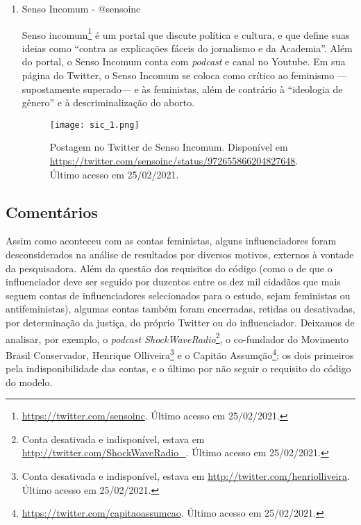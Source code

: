 \documentclass[
	12pt,				%
	openright,			%
	twoside,			%
	a4paper,			%
	english,			%
	brazil				%
	]{abntex2}
\begin{document}
\begin{anexosenv}
\begin{enumerate}
 \item Senso Incomum - @sensoinc
 
 Senso incomum\footnote{\url{https://twitter.com/sensoinc}. Último acesso em 25/02/2021.} é um portal que discute política e cultura, e que define suas ideias como ``contra as explicações fáceis do jornalismo e da Academia''. Além do portal, o Senso Incomum conta com \textit{podcast} e canal no Youtube. Em sua página do Twitter, o Senso Incomum se coloca como crítico ao feminismo --- supostamente superado--- e às feministas, além de contrário à ``ideologia de gênero'' e à descriminalização do aborto.
 
 \begin{figure}[!htbp]
    \centering
    \texttt{[image: sic\_1.png]}
    \caption{Postagem no Twitter de Senso Incomum. Disponível em \url{https://twitter.com/sensoinc/status/972655866204827648}. Último acesso em 25/02/2021.}
 \end{figure}


\end{enumerate}

 \subsection*{Comentários}
 Assim como aconteceu com as contas feministas, alguns influenciadores foram desconsiderados na análise de resultados por diversos motivos, externos à vontade da pesquisadora. Além da questão dos requisitos do código (como o de que o influenciador deve ser seguido por duzentos entre os dez mil cidadãos que mais seguem contas de influenciadores selecionados para o estudo, sejam feministas ou antifeministas), algumas contas também foram encerradas, retidas ou desativadas, por determinação da justiça, do próprio Twitter ou do influenciador. Deixamos de analisar, por exemplo, o \textit{podcast ShockWaveRadio}\footnote{Conta desativada e indisponível, estava em \url{http://twitter.com/ShockWaveRadio_}. Último acesso em 25/02/2021.}, o co-fundador do Movimento Brasil Conservador, Henrique Olliveira\footnote{Conta desativada e indisponível, estava em \url{http://twitter.com/henriolliveira}. Último acesso em 25/02/2021.} e o Capitão Assumção\footnote{\url{https://twitter.com/capitaoassumcao}. Último acesso em 25/02/2021.}; os dois primeiros pela indisponibilidade das contas, e o último por não seguir o requisito do código do modelo.
 

\end{anexosenv}
\end{document}
